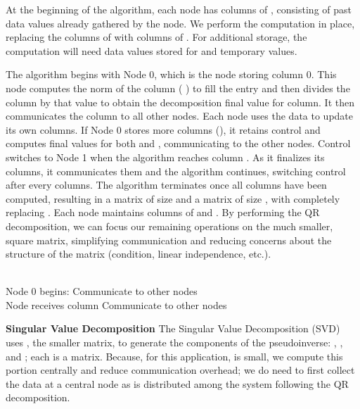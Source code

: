 \documentclass[prodmode,acmtosn]{acmsmall}
\begin{document}
At the beginning of the algorithm, each node has  columns of , consisting of  past data values already gathered by the node.
We perform the computation in place, replacing the columns of  with columns of .
For additional storage, the computation will need  data values stored for  and  temporary values.

The algorithm begins with Node 0, which is the node storing column 0.
This node computes the  norm of the  column ( ) to fill the  entry and then divides the  column by that value to obtain the decomposition final value for  column.
It then communicates the  column to all other nodes.
Each node uses the data to update its own columns.
If Node 0 stores more columns (), it retains control and computes final values for both  and , communicating  to the other nodes.
Control switches to Node 1 when the algorithm reaches column .
As it finalizes its columns, it communicates them and the algorithm continues, switching control after every  columns.
The algorithm terminates once all columns have been computed, resulting in a  matrix of size  and a  matrix of size , with  completely replacing .
Each node maintains  columns of  and .
By performing the QR decomposition, we can focus our remaining operations on the much smaller, square  matrix, simplifying communication and reducing concerns about the structure of the matrix (condition, linear independence, etc.).

\begin{algorithm}
\caption{QR Decomposition}\label{alg:qr}
\begin{algorithmic}
\State 
\State \\

\State Node 0 begins:
\State 
\State 
\State Communicate  to other nodes \\

\For{}
\State Node receives  column
\For{}
\State 
\State 
\If{}
\State 
\State 
\State Communicate  to other nodes
\EndIf
\EndFor
\EndFor
\end{algorithmic}
\end{algorithm}

{\bf Singular Value Decomposition}\newline
The Singular Value Decomposition (SVD) uses , the smaller matrix, to generate the components of the pseudoinverse: , , and ; each is a  matrix.
Because, for this application,  is small, we compute this portion centrally and reduce communication overhead; we do need to first collect the data at a central node as  is distributed among the system following the QR decomposition.
\end{document}

